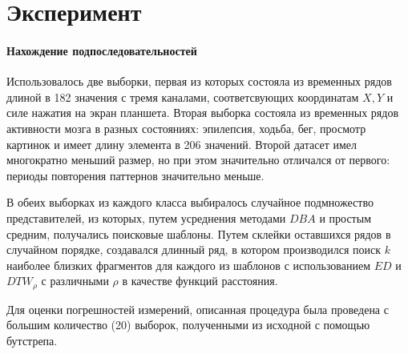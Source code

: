 \documentclass[12pt,twoside]{article}
\begin{document}
						
    \section{Эксперимент}

        \paragraph{Нахождение подпоследовательностей}
        Использовалось две выборки, первая из которых состояла из временных рядов длиной в 182 значения с тремя каналами, соответсвующих координатам $X, Y$ и силе нажатия на экран планшета.
        Вторая выборка состояла из временных рядов активности мозга в разных состояниях: эпилепсия, ходьба, бег, просмотр картинок и имеет длину элемента в 206 значений.
        Второй датасет имел многократно меньший размер, но при этом значительно отличался от первого: периоды повторения паттернов значительно меньше.

        В обеих выборках из каждого класса выбиралось случайное подмножество представителей, из которых, путем усреднения методами $DBA$ и простым средним, получались поисковые шаблоны. 
        Путем склейки оставшихся рядов в случайном порядке, создавался длинный ряд, в котором производился поиск $k$ наиболее близких фрагментов  для каждого из шаблонов с использованием $ED$ и $DTW_\rho$ с различными $\rho$ в качестве функций расстояния.
            
        Для оценки погрешностей измерений, описанная процедура была проведена с большим количество (20) выборок, полученными из исходной с помощью бутстрепа.    
    
\end{document}
